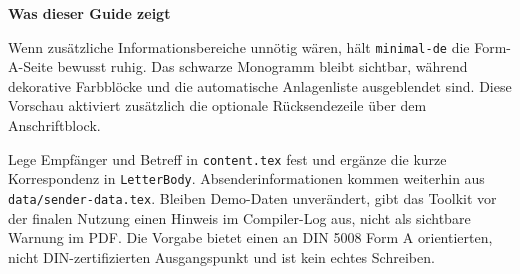 
\UseBackaddresstrue


\begin{LetterBody}

\textbf{Was dieser Guide zeigt}

Wenn zusätzliche Informationsbereiche unnötig wären, hält \texttt{minimal-de} die Form-A-Seite bewusst ruhig. Das schwarze Monogramm bleibt sichtbar, während dekorative Farbblöcke und die automatische Anlagenliste ausgeblendet sind. Diese Vorschau aktiviert zusätzlich die optionale Rücksendezeile über dem Anschriftblock.

Lege Empfänger und Betreff in \texttt{content.tex} fest und ergänze die kurze Korrespondenz in \texttt{LetterBody}. Absenderinformationen kommen weiterhin aus \texttt{data/sender-data.tex}. Bleiben Demo-Daten unverändert, gibt das Toolkit vor der finalen Nutzung einen Hinweis im Compiler-Log aus, nicht als sichtbare Warnung im PDF. Die Vorgabe bietet einen an DIN 5008 Form A orientierten, nicht DIN-zertifizierten Ausgangspunkt und ist kein echtes Schreiben.

\end{LetterBody}
